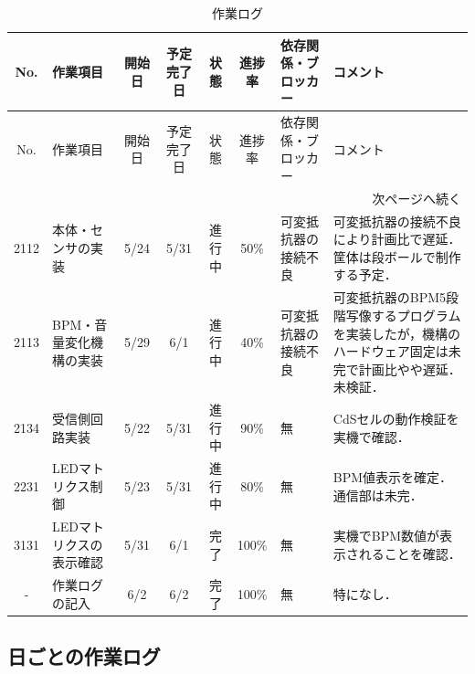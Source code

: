 \documentclass[uplatex,dvipdfmx,a4paper,11pt]{jsarticle}
\begin{document}
\begin{longtable}{|c|p{2.2cm}|c|c|c|c|p{2.4cm}|p{3.1cm}|}
\caption{作業ログ} \\
\hline
No. & 作業項目 & 開始日 & 予定完了日 & 状態 & 進捗率 & 依存関係・ブロッカー & コメント \\
\hline
\endfirsthead

\hline
No. & 作業項目 & 開始日 & 予定完了日 & 状態 & 進捗率 & 依存関係・ブロッカー & コメント \\
\hline
\endhead

\hline
\multicolumn{8}{r}{次ページへ続く} \\
\hline
\endfoot

\hline
\endlastfoot

2112 &
本体・センサの実装 &
5/24 &
5/31 &
進行中 &
50\% &
可変抵抗器の接続不良 &
可変抵抗器の接続不良により計画比で遅延．筐体は段ボールで制作する予定． \\
\hline

2113 &
BPM・音量変化機構の実装 &
5/29 &
6/1 &
進行中 &
40\% &
可変抵抗器の接続不良 &
可変抵抗器のBPM5段階写像するプログラムを実装したが，機構のハードウェア固定は未完で計画比やや遅延．未検証． \\
\hline

2134 &
受信側回路実装 &
5/22 &
5/31 &
進行中 &
90\% &
無 &
CdSセルの動作検証を実機で確認． \\
\hline

2231 &
LEDマトリクス制御 &
5/23 &
5/31 &
進行中 &
80\% &
無 &
BPM値表示を確定．通信部は未完． \\
\hline

3131 &
LEDマトリクスの表示確認 &
5/31 &
6/1 &
完了 &
100\% &
無 &
実機でBPM数値が表示されることを確認． \\
\hline

- &
作業ログの記入 &
6/2 &
6/2 &
完了 &
100\% &
無 &
特になし． \\
\hline



\end{longtable}


\subsection{日ごとの作業ログ}


    \renewcommand{\arraystretch}{1.2}

    \small
\end{document}
